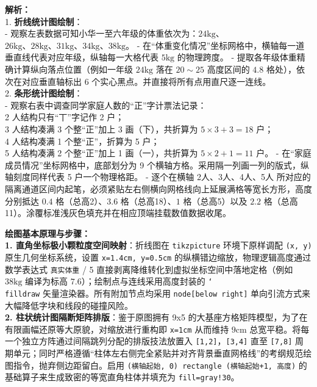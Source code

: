 {\small\color{gray}
\textbf{解析：}\\
1. \textbf{折线统计图绘制}：\\
- 观察左表数据可知小华一至六年级的体重依次为：$24\text{kg}$、$26\text{kg}、28\text{kg}、31\text{kg}、34\text{kg}、38\text{kg}$。
- 在“体重变化情况”坐标网格中，横轴每一道垂直线代表对应年级，纵轴每一大格代表 $5\text{kg}$ 的物理跨度。
- 提取各年级体重精确计算纵向落点位置（例如一年级 $24\text{kg}$ 落在 $20 \sim 25$ 高度区间的 $4.8$ 格处），依次在对应垂直轴标出 6 个实心黑点。并直接将所有点用直尺逐一连线。\\
2. \textbf{条形统计图绘制}：\\
- 观察右表中调查同学家庭人数的“正”字计票法记录：\\
  2 人结构只有“丅”字记作 2 户；\\
  3 人结构凑满 3 个整“正”加上 3 画（下），共折算为 $5\times3+3=18$ 户；\\
  4 人结构凑满 1 个整“正”，折算为 5 户；\\
  5 人结构凑满 2 个整“正”加上 1 画（一），共折算为 $5\times2+1=11$ 户。
- 在“家庭成员情况”坐标网格中，底部划分为 9 个横轴方格。采用隔一列画一列的版式，纵轴刻度同样代表 5 户一个物理格距。
- 逐个在横轴 2人$、$3人、4人、5人 所对应的隔离通道区间内起笔，必须紧贴左右侧横向网格线向上延展满格等宽长方形，高度分别抵达 $0.4$ 格（总高2）、$3.6$ 格（总高18）、$1$ 格（总高5）以及 $2.2$ 格（总高11）。涂覆标准浅灰色填充并在相应顶端挂载数值数据收尾。
}

\vspace{0.6cm}

{\small\color{blue!70!black}
\textbf{绘图基本原理与步骤：}\\
\textbf{1. 直角坐标极小颗粒度空间映射}：折线图在 \texttt{tikzpicture} 环境下原样调配 \texttt{(x, y)} 原生几何坐标系统，设置 \texttt{x=1.4cm, y=0.5cm} 的纵横错边缩放，物理逻辑高度通过数学表达式 \texttt{真实体重} / 5 直接剥离降维转化到虚拟坐标空间中落地定格（例如 $38\text{kg}$ 编译为标高 $7.6$）；绘制点与连线采用高度封装的 \texttt{\char`\\filldraw} 矢量渲染器。所有附加节点均采用 \texttt{node[below right]} 单向引流方式来大幅降低字块和线段的碰撞风险。\\
\textbf{2. 柱状统计图隔断矩阵排版}：鉴于原图拥有 9x5 的大基座方格矩阵模型，为了在有限画幅还原等大原貌，对缩放进行重构即 \texttt{x=1cm} 从而维持 $9\text{cm}$ 总宽平稳。将每一个独立方阵通过间隔跳列分配的排版技法放置入 \texttt{[1,2]}，\texttt{[3,4]} 直至 \texttt{[7,8]} 周期单元；同时严格遵循“柱体左右侧完全紧贴并对齐背景垂直网格线”的考纲规范绘图指令，抛弃侧边距留白。启用 \texttt{(横轴起始, 0) rectangle (横轴起始+1, 高度)} 的基础算子来生成致密的等宽直角柱体并填充为 \texttt{fill=gray!30}。
}

